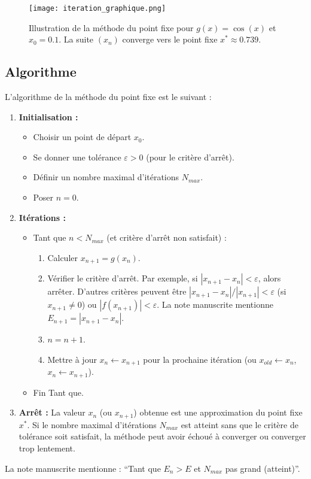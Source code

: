\begin{figure}[H]
\centering
\texttt{[image: iteration\_graphique.png]}
\caption{Illustration de la méthode du point fixe pour $g(x) = \cos(x)$ et $x_0 = 0.1$. La suite $(x_n)$ converge vers le point fixe $x^* \approx 0.739$.}
\label{fig:iteration_graphique}
\end{figure}

\subsection{Algorithme}
\label{ssec:iteration_algorithme}
L'algorithme de la méthode du point fixe est le suivant :
\begin{enumerate}
    \item \textbf{Initialisation :}
    \begin{itemize}
        \item Choisir un point de départ $x_0$.
        \item Se donner une tolérance $\varepsilon > 0$ (pour le critère d'arrêt).
        \item Définir un nombre maximal d'itérations $N_{max}$.
        \item Poser $n=0$.
    \end{itemize}
    \item \textbf{Itérations :}
    \begin{itemize}
        \item Tant que $n < N_{max}$ (et critère d'arrêt non satisfait) :
        \begin{enumerate}
            \item Calculer $x_{n+1} = g(x_n)$.
            \item Vérifier le critère d'arrêt. Par exemple, si $|x_{n+1} - x_n| < \varepsilon$, alors arrêter. D'autres critères peuvent être $|x_{n+1} - x_n|/|x_{n+1}| < \varepsilon$ (si $x_{n+1} \neq 0$) ou $|f(x_{n+1})| < \varepsilon$. La note manuscrite mentionne $E_{n+1} = |x_{n+1} - x_n|$.
            \item $n = n+1$.
            \item Mettre à jour $x_n \leftarrow x_{n+1}$ pour la prochaine itération (ou $x_{old} \leftarrow x_n$, $x_n \leftarrow x_{n+1}$).
        \end{enumerate}
        \item Fin Tant que.
    \end{itemize}
    \item \textbf{Arrêt :} La valeur $x_n$ (ou $x_{n+1}$) obtenue est une approximation du point fixe $x^*$. Si le nombre maximal d'itérations $N_{max}$ est atteint sans que le critère de tolérance soit satisfait, la méthode peut avoir échoué à converger ou converger trop lentement.
\end{enumerate}
La note manuscrite mentionne : ``Tant que $E_n > E$ et $N_{max}$ pas grand (atteint)''.

